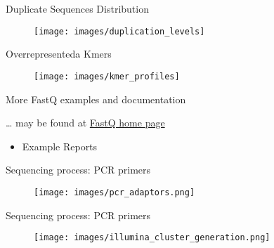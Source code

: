 \documentclass{beamer}
\begin{document}
\begin{frame}{Duplicate Sequences Distribution}

\begin{figure}[htbp]
\centering
\texttt{[image: images/duplication\_levels]}

\end{figure}

\end{frame}

\begin{frame}{Overrepresenteda Kmers}

\begin{figure}[htbp]
\centering
\texttt{[image: images/kmer\_profiles]}

\end{figure}

\end{frame}

\begin{frame}{More FastQ examples and documentation}

\ldots{} may be found at
\href{http://www.bioinformatics.babraham.ac.uk/projects/fastqc/}{FastQ
home page}

\begin{itemize}
\itemsep1pt\parskip0pt
\item
  Example Reports
\end{itemize}

\end{frame}

\begin{frame}{Sequencing process: PCR primers}

\begin{figure}[htbp]
\centering
\texttt{[image: images/pcr\_adaptors.png]}

\end{figure}

\end{frame}

\begin{frame}{Sequencing process: PCR primers}

\begin{figure}[htbp]
\centering
\texttt{[image: images/illumina\_cluster\_generation.png]}

\end{figure}

\end{frame}
\end{document}
